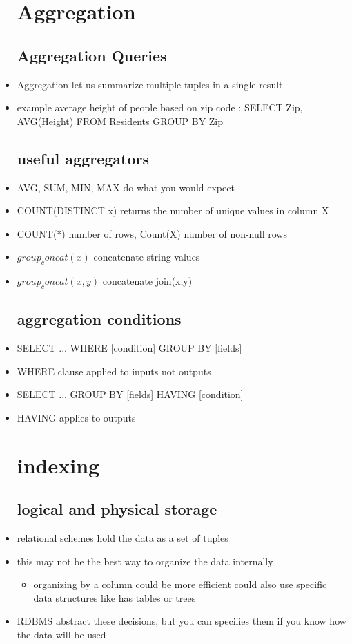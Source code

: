 \documentclass{article}
\begin{document}
\begin{itemize}
\section{Aggregation }
\subsection{ Aggregation  Queries}
\item Aggregation let us summarize multiple tuples in a single result 
\item example average height of people based on zip code : SELECT Zip, AVG(Height) FROM Residents GROUP BY Zip 
\subsection{useful aggregators}
\item AVG, SUM, MIN, MAX do what you would expect
\item COUNT(DISTINCT x) returns the number of unique values in column X
\item COUNT(*) number of rows, Count(X) number of non-null rows
\item $group_concat(x)$ concatenate string values
\item $group_concat(x,y)$ concatenate join(x,y)
\subsection{aggregation conditions}
\item SELECT ... WHERE [condition] GROUP BY [fields]
\item WHERE clause applied to inputs not outputs 
\item SELECT ... GROUP BY [fields] HAVING [condition]
\item HAVING applies to outputs
\section{indexing}
\subsection{logical and physical storage}
\item relational schemes hold the data as a set of tuples
\item this may not be the best way to organize the data internally
\begin{itemize}
    \item organizing by a column could be more efficient 
    \itme could also use specific data structures like has tables or trees
\end{itemize}
\item RDBMS abstract these decisions, but you can specifies them if you know how the data will be used

\end{itemize}
\end{document}
